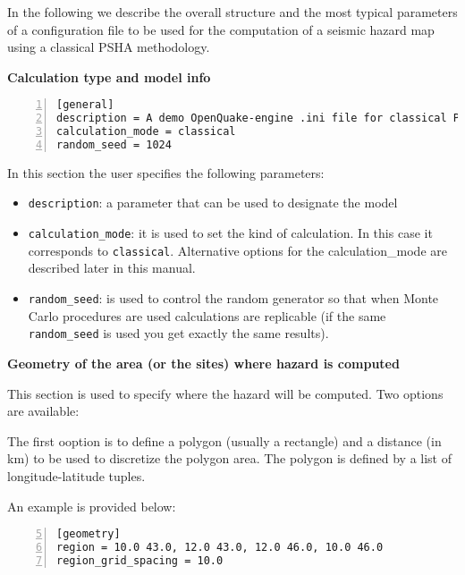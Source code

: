 In the following we describe the overall structure and the most typical
parameters of a configuration file to be used for the computation of a
seismic hazard map using a classical PSHA methodology.


\textbf{Calculation type and model info}

\begin{Verbatim}[frame=single, commandchars=\\\{\}, fontsize=\small,
    numbers=left, numbersep=2pt]
[general]
description = A demo OpenQuake-engine .ini file for classical PSHA
calculation_mode = classical
random_seed = 1024
\end{Verbatim}

In this section the user specifies the following parameters:

\begin{itemize}

    \item \texttt{description}: a parameter that can be used to designate
    the model

    \item \texttt{calculation\_mode}: it is used to set the kind of
    calculation. In this case it corresponds to \texttt{classical}.
    Alternative options for the calculation\_mode are described later in this
    manual.

    \item \texttt{random\_seed}: is used to control the random generator
    so that when Monte Carlo procedures are used calculations are
    replicable (if the same \texttt{random\_seed} is used you get exactly
    the same results).

\end{itemize}



\textbf{Geometry of the area (or the sites) where hazard is computed}

This section is used to specify where the hazard will be computed. Two
options are available:

The first ooption is to define a polygon (usually a rectangle) and a distance
(in km) to be used to discretize the  polygon area. The polygon is defined by
a list of longitude-latitude tuples.

An example is provided below:

\begin{Verbatim}[frame=single, commandchars=\\\{\}, fontsize=\small,
    firstnumber=5, numbers=left, numbersep=2pt]
[geometry]
region = 10.0 43.0, 12.0 43.0, 12.0 46.0, 10.0 46.0
region_grid_spacing = 10.0
\end{Verbatim}

